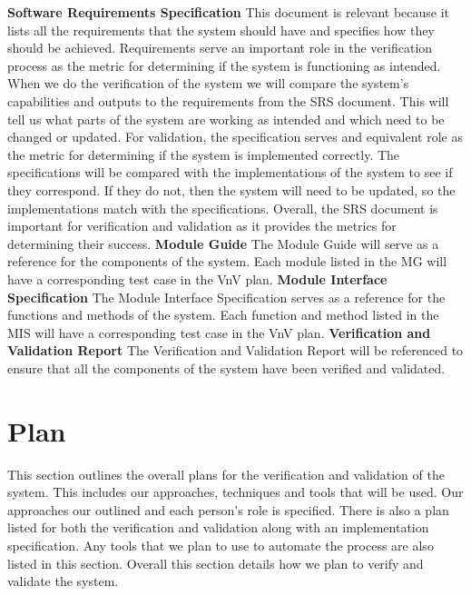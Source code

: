 \documentclass[12pt, titlepage]{article}
\begin{document}
\noindent \textbf{Software Requirements Specification} \citet{SRS}
\newline
This document is relevant because it lists all the requirements that the system should have and specifies how they should be achieved.
Requirements serve an important role in the verification process as the metric for determining if the system is functioning as intended.
When we do the verification of the system we will compare the system's capabilities and outputs to the requirements from the SRS document.
This will tell us what parts of the system are working as intended and which need to be changed or updated.
For validation, the specification serves and equivalent role as the metric for determining if the system is implemented correctly.
The specifications will be compared with the implementations of the system to see if they correspond.
If they do not, then the system will need to be updated, so the implementations match with the specifications.
Overall, the SRS document is important for verification and validation as it provides the metrics for determining their success.
\bigskip
\newline
\textbf{Module Guide}
\newline
The Module Guide will serve as a reference for the components of the system.
Each module listed in the MG will have a corresponding test case in the VnV plan.
\bigskip
\newline
\textbf{Module Interface Specification}
\newline
The Module Interface Specification serves as a reference for the functions and methods of the system.
Each function and method listed in the MIS will have a corresponding test case in the VnV plan.
\bigskip
\newline
\textbf{Verification and Validation Report}
\newline
The Verification and Validation Report will be referenced to ensure that all the components of the system have been verified and validated.

\section{Plan}

This section outlines the overall plans for the verification and validation of the system.
This includes our approaches, techniques and tools that will be used.
Our approaches our outlined and each person's role is specified.
There is also a plan listed for both the verification and validation along with an implementation specification.
Any tools that we plan to use to automate the process are also listed in this section.
Overall this section details how we plan to verify and validate the system.
\end{document}
